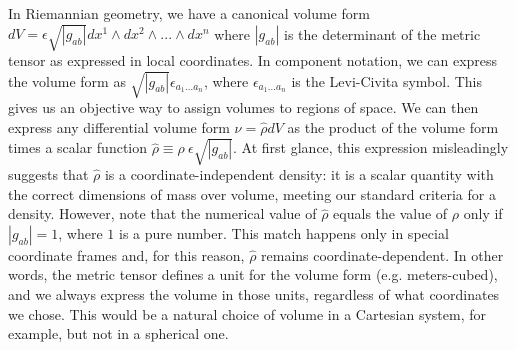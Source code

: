 \documentclass[letterpaper]{article}
\begin{document}
In Riemannian geometry, we have a canonical volume form $dV = \epsilon \sqrt{|g_{ab}|} dx^1 \wedge dx^2 \wedge ... \wedge dx^n$ where $|g_{ab}|$ is the determinant of the metric tensor as expressed in local coordinates. In component notation, we can express the volume form as $\sqrt{|g_{ab}|}\epsilon_{a_1 ... a_n}$, where $\epsilon_{a_1 ... a_n}$ is the Levi-Civita symbol. This gives us an objective way to assign volumes to regions of space. We can then express any differential volume form $\nu = \hat{\rho} dV$ as the product of the volume form times a scalar function $\hat{\rho} \equiv \rho \ \epsilon \sqrt{|g_{ab}|}$. At first glance, this expression misleadingly suggests that $\hat{\rho}$ is a coordinate-independent density: it is a scalar quantity with the correct dimensions of mass over volume, meeting our standard criteria for a density. However, note that the numerical value of $\hat{\rho} $ equals the value of $\rho$ only if $|g_{ab}| = 1$, where $1$ is a pure number. This match happens only in special coordinate frames and, for this reason, $\hat{\rho} $ remains coordinate-dependent. In other words, the metric tensor defines a unit for the volume form (e.g. meters-cubed), and we always express the volume in those units, regardless of what coordinates we chose. This would be a natural choice of volume in a Cartesian system, for example, but not in a spherical one. 
\end{document}
